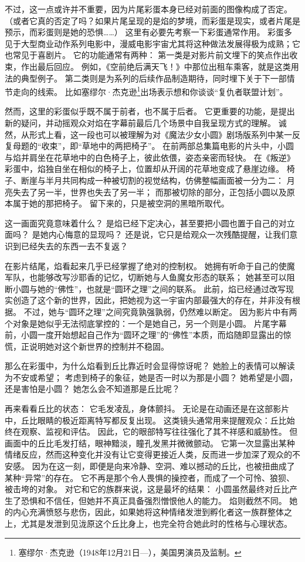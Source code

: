 不过，这一点或许并不重要，因为片尾彩蛋本身已经对前面的图像构成了否定。
（或者它真的否定了吗？如果片尾呈现的是焰的梦境，而彩蛋是现实，或者片尾是预示，而彩蛋则是她的恐惧……）
这里有必要先考察一下彩蛋通常作用。
彩蛋多见于大型商业动作系列电影中，漫威电影宇宙尤其将这种做法发展得极为成熟；它也常见于喜剧片。
它的功能通常有两种：
第一类是对影片前文埋下的笑点作出收束，作出最后回应。
例如，《空前绝后满天飞！》中那位出租车乘客，就是这类用法的典型例子。
第二类则是为系列的后续作品制造期待，同时埋下关于下一部情节走向的线索。
比如塞缪尔·杰克逊\footnote{%
    塞缪尔·杰克逊（1948年12月21日—），美国男演员及监制。
}出场表示想和你谈谈“复仇者联盟计划”。

然而，这里的彩蛋似乎既不属于前者，也不属于后者。
它更重要的功能，是提出新的疑问，并动摇观众对焰在字幕前最后几个场景中自我呈现方式的理解。
诚然，从形式上看，这一段也可以被理解为对《魔法少女小圆》剧场版系列中某一反复母题的“收束”，即“草地中的两把椅子”。
在前两部总集篇电影的片头中，小圆与焰并肩坐在花草地中的白色椅子上，彼此依偎，姿态亲密而轻快。
在《叛逆》彩蛋中，焰独自坐在相似的椅子上，位置却从开阔的花草地变成了悬崖边缘。
椅子、断崖与半月共同构成一种被切割的视觉结构，仿佛整幅画面被一分为二：
月亮失去了另一半，世界也失去了另一半；
而那被切除的部分，正包括小圆以及原本属于她的那把椅子。
留下来的，只是被空洞的黑暗所取代。

这一画面究竟意味着什么？
是焰已经下定决心，甚至要把小圆也置于自己的对立面吗？
是她内心悔意的显现吗？
还是说，它只是给观众一次残酷提醒，让我们意识到已经失去的东西一去不复返？

在影片结尾，焰看起来几乎已经掌握了绝对的控制权。
她拥有听命于自己的使魔军队，也能够改写沙耶香的记忆，切断她与人鱼魔女形态的联系；
她甚至可以阻断小圆与她的“佛性”，也就是“圆环之理”之间的联系。
此前，焰已经通过改写现实创造了这个新的世界，因此，把她视为这一宇宙内部最强大的存在，并非没有根据。
不过，她与“圆环之理”之间究竟孰强孰弱，仍然难以断定。
因为影片中有两个对象是她似乎无法彻底掌控的：一个是她自己，另一个则是小圆。
片尾字幕前，小圆一度开始想起自己作为“圆环之理”的“佛性”本质，而焰随即显露出的惊慌，正说明她对这个新世界的控制并不稳固。

那么在彩蛋中，为什么焰看到丘比靠近时会显得惊讶呢？
她脸上的表情可以解读为不安或希望；
考虑到椅子的象征，她是否一时以为那是小圆？
她希望是小圆，还是害怕是小圆？
她怎么会不知道那是丘比呢？

再来看看丘比的状态：
它毛发凌乱，身体颤抖。
无论是在动画还是在这部影片中，丘比眼睛的极近距离特写都反复出现。
这类镜头通常用来提醒观众：丘比始终在观察、监视和评估。
因此，它的眼部特写往往强化了其不祥感和威胁性。
但画面中的丘比毛发打结，眼神黯淡，瞳孔发黑并微微颤动。
它第一次显露出某种情绪反应，然而这种变化并没有让它变得更接近人类，反而进一步加深了观众的不安感。
因为在这一刻，即便是向来冷静、空洞、难以撼动的丘比，也被扭曲成了某种“异常”的存在。
它不再是那个令人畏惧的操控者，而成了一个可怜、狼狈、被击垮的对象。
对它和它的族群来说，这是最坏的结果：
小圆虽然最终对丘比产生了恐惧和不信任，但她并不真正具备强烈憎恨他人的能力。
焰则截然不同。
她的内心充满愤怒与悲伤，因此，如果她将这种情绪发泄到孵化者这一族群整体之上，尤其是发泄到见泷原这个丘比身上，也完全符合她此时的性格与心理状态。

